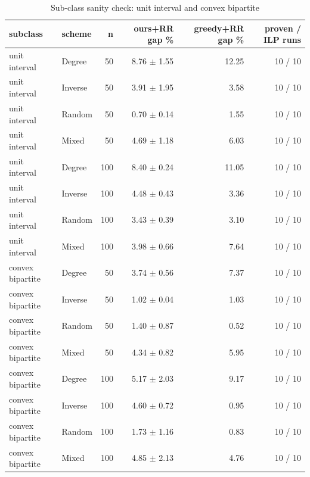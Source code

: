 \begin{table}[t]
\centering
\small
\caption{Sub-class sanity check: unit interval and convex bipartite}
\begin{tabular}{llrrrr}
\toprule
subclass & scheme & n & ours+RR gap \% & greedy+RR gap \% & proven / ILP runs \\
\midrule
unit interval & Degree & 50 & 8.76 $\pm$ 1.55 & 12.25 & 10 / 10 \\
unit interval & Inverse & 50 & 3.91 $\pm$ 1.95 & 3.58 & 10 / 10 \\
unit interval & Random & 50 & 0.70 $\pm$ 0.14 & 1.55 & 10 / 10 \\
unit interval & Mixed & 50 & 4.69 $\pm$ 1.18 & 6.03 & 10 / 10 \\
unit interval & Degree & 100 & 8.40 $\pm$ 0.24 & 11.05 & 10 / 10 \\
unit interval & Inverse & 100 & 4.48 $\pm$ 0.43 & 3.36 & 10 / 10 \\
unit interval & Random & 100 & 3.43 $\pm$ 0.39 & 3.10 & 10 / 10 \\
unit interval & Mixed & 100 & 3.98 $\pm$ 0.66 & 7.64 & 10 / 10 \\
convex bipartite & Degree & 50 & 3.74 $\pm$ 0.56 & 7.37 & 10 / 10 \\
convex bipartite & Inverse & 50 & 1.02 $\pm$ 0.04 & 1.03 & 10 / 10 \\
convex bipartite & Random & 50 & 1.40 $\pm$ 0.87 & 0.52 & 10 / 10 \\
convex bipartite & Mixed & 50 & 4.34 $\pm$ 0.82 & 5.95 & 10 / 10 \\
convex bipartite & Degree & 100 & 5.17 $\pm$ 2.03 & 9.17 & 10 / 10 \\
convex bipartite & Inverse & 100 & 4.60 $\pm$ 0.72 & 0.95 & 10 / 10 \\
convex bipartite & Random & 100 & 1.73 $\pm$ 1.16 & 0.83 & 10 / 10 \\
convex bipartite & Mixed & 100 & 4.85 $\pm$ 2.13 & 4.76 & 10 / 10 \\
\bottomrule
\end{tabular}
\end{table}
